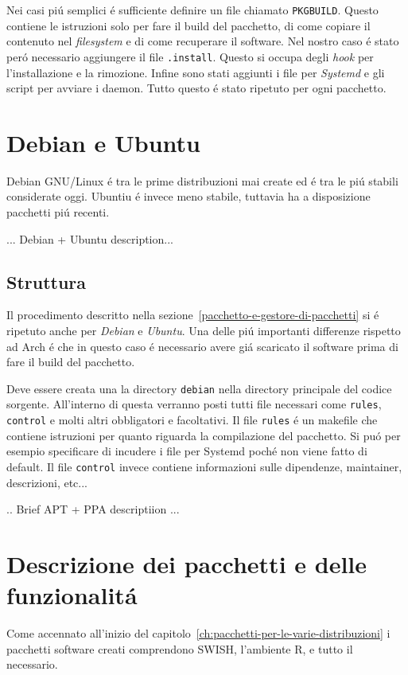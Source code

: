 \documentclass[10pt,titlepage,twoside,a4paper]{report}
\begin{document}
Nei casi pi\'u semplici \'e sufficiente definire un file chiamato 
\texttt{PKGBUILD}. Questo contiene le istruzioni solo per fare il build del 
pacchetto, di come copiare il contenuto nel \emph{filesystem} e di come 
recuperare il software. Nel nostro caso \'e stato per\'o necessario aggiungere
il file \texttt{.install}. Questo si occupa degli \emph{hook} per 
l'installazione e la rimozione. Infine sono stati aggiunti i file per 
\emph{Systemd} e gli script per avviare i daemon. Tutto questo \'e stato 
ripetuto per ogni pacchetto.

\section{Debian e Ubuntu}
Debian GNU/Linux \'e tra le prime distribuzioni mai create ed \'e tra le pi\'u 
stabili considerate oggi. Ubuntiu \'e invece meno stabile, tuttavia ha a 
disposizione pacchetti pi\'u recenti. 

... Debian + Ubuntu description...

\subsection{Struttura}
Il procedimento descritto nella sezione~\ref{pacchetto-e-gestore-di-pacchetti}
si \'e ripetuto anche per \emph{Debian} e \emph{Ubuntu}. Una delle pi\'u 
importanti differenze rispetto ad Arch \'e che in questo caso \'e necessario 
avere gi\'a scaricato il software prima di fare il build del pacchetto.

Deve essere creata una la directory \texttt{debian} nella directory principale 
del codice sorgente. All'interno di questa verranno posti tutti file 
necessari come \texttt{rules}, \texttt{control} e molti altri obbligatori e 
facoltativi. Il file \texttt{rules} \'e un makefile che contiene istruzioni per 
quanto riguarda la compilazione del pacchetto. Si pu\'o per esempio specificare 
di incudere i file per Systemd poch\'e non viene fatto di default. Il file 
\texttt{control} invece contiene informazioni sulle dipendenze, maintainer, 
descrizioni, etc... 

.. Brief APT + PPA descriptiion ...

\section{Descrizione dei pacchetti e delle funzionalit\'a}
Come accennato all'inizio del capitolo~\ref{ch:pacchetti-per-le-varie-distribuzioni}
i pacchetti software creati comprendono SWISH, l'ambiente R, e tutto il 
necessario.
\end{document}
